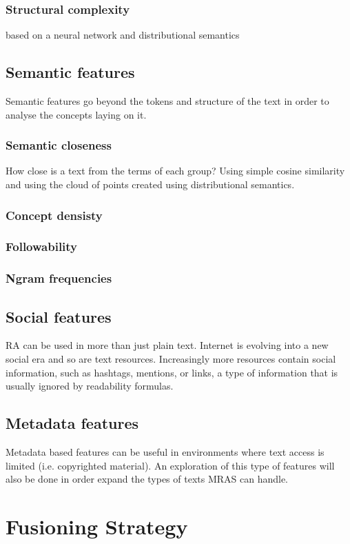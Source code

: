 \documentclass{bsu-ms}
\begin{document}
\subsubsection*{Structural complexity}
based on a neural network and distributional semantics

\subsection{Semantic features}
Semantic features go beyond the tokens and structure of the text in order to analyse the concepts laying on it.

\subsubsection*{Semantic closeness}
How close is a text from the terms of each group?
Using simple cosine similarity and using the cloud of points created using distributional semantics.
\subsubsection*{Concept densisty}
\subsubsection*{Followability}
\subsubsection*{Ngram frequencies}
\subsection{Social features}
RA can be used in more than just plain text. Internet is evolving into a new social era and so are text resources. Increasingly more resources contain social information, such as hashtags, mentions, or links, a type of information that is usually ignored by readability formulas.

\subsection{Metadata features}
Metadata based features can be useful in environments where text access is limited (i.e. copyrighted material). An exploration of this type of features will also be done in order expand the types of texts MRAS can handle.




\section{Fusioning Strategy}
\label{sec:fusion}
\end{document}
